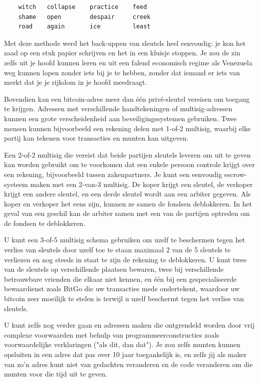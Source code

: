 \begin{verbatim}
    witch   collapse    practice    feed
    shame   open        despair     creek
    road    again       ice         least
\end{verbatim}

Met deze methode werd het back-uppen van sleutels heel eenvoudig: je kon het zaad op een stuk papier schrijven en het in een kluisje stoppen. Je zou de zin zelfs uit je hoofd kunnen leren en uit een falend economisch regime als Venezuela weg kunnen lopen zonder iets bij je te hebben, zonder dat iemand er iets van merkt dat je je rijkdom in je hoofd meedraagt. 

Bovendien kan een bitcoin-adres meer dan één privé-sleutel vereisen om toegang te krijgen. Adressen met verschillende handtekeningen of multisig-adressen kunnen een grote verscheidenheid aan beveiligingssystemen gebruiken. Twee mensen kunnen bijvoorbeeld een rekening delen met 1-of-2 multisig, waarbij elke partij kan tekenen voor transacties en munten kan uitgeven. 

Een 2-of-2 multisig die vereist dat beide partijen sleutels leveren om uit te geven kan worden gebruikt om te voorkomen dat een enkele persoon controle krijgt over een rekening, bijvoorbeeld tussen zakenpartners.  Je kunt een eenvoudig escrow-systeem maken met een 2-van-3 multisig. De koper krijgt een sleutel, de verkoper krijgt een andere sleutel, en een derde sleutel wordt aan een arbiter gegeven. Als koper en verkoper het eens zijn, kunnen ze samen de fondsen deblokkeren. In het geval van een geschil kan de arbiter samen met een van de partijen optreden om de fondsen te deblokkeren. 

U kunt een 3-of-5 multisig schema gebruiken om uzelf te beschermen tegen het verlies van sleutels door uzelf toe te staan maximaal 2 van de 5 sleutels te verliezen en nog steeds in staat te zijn de rekening te deblokkeren. U kunt twee van de sleutels op verschillende plaatsen bewaren, twee bij verschillende betrouwbare vrienden die elkaar niet kennen, en één bij een gespecialiseerde bewaardienst zoals BitGo die uw transacties mede ondertekent, waardoor uw bitcoin zeer moeilijk te stelen is terwijl u uzelf beschermt tegen het verlies van sleutels. 

U kunt zelfs nog verder gaan en adressen maken die ontgrendeld worden door vrij complexe voorwaarden met behulp van programmeerconstructies zoals voorwaardelijke verklaringen ("als dit, dan dat"). Je zou zelfs munten kunnen opsluiten in een adres dat pas over 10 jaar toegankelijk is, en zelfs jij als maker van zo'n adres kunt niet van gedachten veranderen en de code veranderen om die munten voor die tijd uit te geven. 

